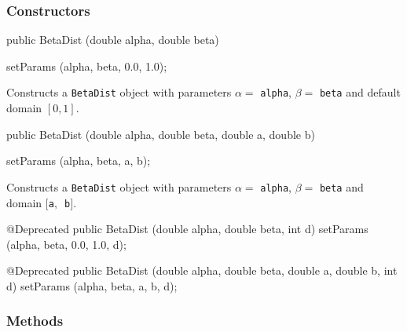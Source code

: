 \subsubsection* {Constructors}

\begin{code}

   public BetaDist (double alpha, double beta)\begin{hide} {
      setParams (alpha, beta, 0.0, 1.0);
   }\end{hide}
\end{code}
  \begin{tabb}  Constructs a \texttt{BetaDist} object with parameters $\alpha =$
     \texttt{alpha}, $\beta =$ \texttt{beta} and default domain $[0,1]$.
  \end{tabb}
\begin{code}

   public BetaDist (double alpha, double beta, double a, double b)\begin{hide} {
      setParams (alpha, beta, a, b);
   }\end{hide}
\end{code}
  \begin{tabb}  Constructs a \texttt{BetaDist} object with parameters $\alpha =$
     \texttt{alpha}, $\beta =$ \texttt{beta} and domain $[$\texttt{a}$,$~\texttt{b}$]$.
  \end{tabb}
\begin{hide}\begin{code}

   @Deprecated
   public BetaDist (double alpha, double beta, int d) {
      setParams (alpha, beta, 0.0, 1.0, d);
   }

   @Deprecated
   public BetaDist (double alpha, double beta, double a, double b, int d) {
      setParams (alpha, beta, a, b, d);
   }
\end{code}\end{hide}


\subsubsection* {Methods}

